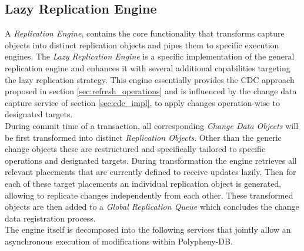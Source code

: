 
\subsection{Lazy Replication Engine}
\label{sec:lazy:_engine}

A \emph{Replication Engine}, contains the core functionality that transforms capture objects into distinct replication objects and 
pipes them to specific execution engines.
The \emph{Lazy Replication Engine} is a specific implementation of the general replication engine and enhances it with several additional capabilities targeting
the lazy replication strategy. This engine essentially provides the CDC approach proposed in section \ref{sec:refresh_operations} and is influenced by the 
change data capture service of section \ref{sec:cdc_impl}, to apply changes operation-wise to designated targets.\\

During commit time of a transaction, all corresponding \emph{Change Data Objects} will be first transformed into distinct \emph{Replication Objects}. Other than
the generic change objects these are restructured and specifically tailored to specific operations and designated targets. During transformation the engine retrieves all 
relevant placements that are currently defined to receive updates lazily. Then for each of these target placements an individual replication object is generated, allowing to 
replicate changes independently from each other. These transformed objects are then added to a \emph{Global Replication Queue} which concludes the change data registration process.\\


The engine itself is decomposed into the following services that jointly allow an asynchronous execution of modifications within Polypheny-DB. 

